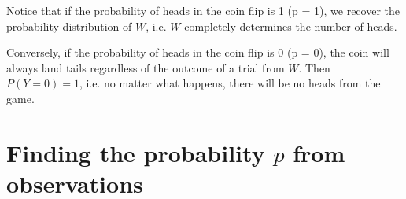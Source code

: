 \documentclass{article}
\begin{document}
\begin{flushleft}
Notice that if the probability of heads in the coin flip is 1 (p = 1), we recover the probability distribution of $W$, i.e. $W$ completely determines the number of heads.\newline

Conversely, if the probability of heads in the coin flip is 0 (p = 0), the coin will always land tails regardless of the outcome of a trial from $W$. Then $P(Y=0) = 1$, i.e. no matter what happens, there will be no heads from the game.

\end{flushleft}
\section{Finding the probability $p$ from observations} %
\end{document}
